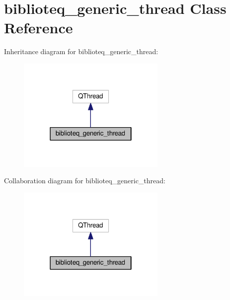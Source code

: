 \hypertarget{classbiblioteq__generic__thread}{}\section{biblioteq\+\_\+generic\+\_\+thread Class Reference}
\label{classbiblioteq__generic__thread}


Inheritance diagram for biblioteq\+\_\+generic\+\_\+thread\+:
\nopagebreak
\begin{figure}[H]
\begin{center}
\leavevmode
\includegraphics[width=202pt]{classbiblioteq__generic__thread__inherit__graph}
\end{center}
\end{figure}


Collaboration diagram for biblioteq\+\_\+generic\+\_\+thread\+:
\nopagebreak
\begin{figure}[H]
\begin{center}
\leavevmode
\includegraphics[width=202pt]{classbiblioteq__generic__thread__coll__graph}
\end{center}
\end{figure}
